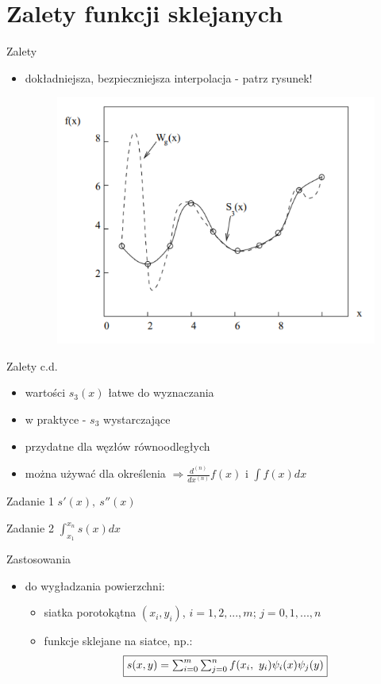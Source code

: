 \section{Zalety funkcji sklejanych}
\begin{frame}{Zalety}
	\begin{itemize}
	\item dokładniejsza, bezpieczniejsza interpolacja - patrz rysunek!
    \begin{figure}[h]
			\includegraphics[width=.75\linewidth]{img/4/spline_img_5}
		\end{figure}
	\end{itemize}
\end{frame}
\begin{frame}{Zalety c.d.}
	\begin{itemize}
		\item wartości $s_{3}(x)$ łatwe do wyznaczania
    	\item w praktyce - $s_{3}$ wystarczające
    	\item przydatne dla węzłów równoodległych
    	\item można używać dla określenia $\Rightarrow \frac{d^{(n)}}	
        	{dx^(n)}f(x)$
    		i $\int f(x)dx$ 
	\end{itemize}
	\begin{block}{Zadanie 1}
        	$s'(x), \ s''(x)$
    \end{block}
    \begin{block}{Zadanie 2}
        	$\int^{x_{n}}_{x_{1}}s(x)dx$
    \end{block}
\end{frame}
\begin{frame}{Zastosowania}
	\begin{itemize}
		\item do wygładzania powierzchni:
        	\begin{itemize}
        		\item siatka porotokątna $(x_{i},y_{i})$, $i=1,2,...,m$; 
                	$j=0,1,...,n$
                \item funkcje sklejane na siatce, np.: 
                \[
                	\framebox{$s(x,y)=\sum_{i=0}^{m}\sum_{j=0}^{n}f(x_{i},
                    \ y_{i})\psi_{i}(x)\psi_{j}(y)$}
                \]
        	\end{itemize}
	\end{itemize}
\end{frame}







